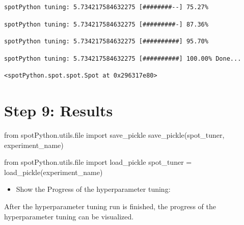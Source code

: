 \documentclass[
  letterpaper,
  DIV=11,
  numbers=noendperiod]{scrreprt}
\newenvironment{Shaded}{\begin{snugshade}}{\end{snugshade}}
\newcommand{\BuiltInTok}[1]{\textcolor[rgb]{0.00,0.23,0.31}{#1}}
\newcommand{\ImportTok}[1]{\textcolor[rgb]{0.00,0.46,0.62}{#1}}
\newcommand{\NormalTok}[1]{\textcolor[rgb]{0.00,0.23,0.31}{#1}}
\newcommand{\OperatorTok}[1]{\textcolor[rgb]{0.37,0.37,0.37}{#1}}
\providecommand{\tightlist}{%
  \setlength{\itemsep}{0pt}\setlength{\parskip}{0pt}}\usepackage{longtable,booktabs,array}
\begin{document}
\begin{verbatim}
spotPython tuning: 5.734217584632275 [########--] 75.27% 
\end{verbatim}

\begin{verbatim}
spotPython tuning: 5.734217584632275 [#########-] 87.36% 
\end{verbatim}

\begin{verbatim}
spotPython tuning: 5.734217584632275 [##########] 95.70% 
\end{verbatim}

\begin{verbatim}
spotPython tuning: 5.734217584632275 [##########] 100.00% Done...
\end{verbatim}

\begin{verbatim}
<spotPython.spot.spot.Spot at 0x296317e80>
\end{verbatim}

\hypertarget{sec-results-tuning-10}{%
\section{Step 9: Results}\label{sec-results-tuning-10}}

\begin{Shaded}
\begin{Highlighting}[]
\ImportTok{from}\NormalTok{ spotPython.utils.}\BuiltInTok{file} \ImportTok{import}\NormalTok{ save\_pickle}
\NormalTok{save\_pickle(spot\_tuner, experiment\_name)}
\end{Highlighting}
\end{Shaded}

\begin{Shaded}
\begin{Highlighting}[]
\ImportTok{from}\NormalTok{ spotPython.utils.}\BuiltInTok{file} \ImportTok{import}\NormalTok{ load\_pickle}
\NormalTok{spot\_tuner }\OperatorTok{=}\NormalTok{ load\_pickle(experiment\_name)}
\end{Highlighting}
\end{Shaded}

\begin{itemize}
\tightlist
\item
  Show the Progress of the hyperparameter tuning:
\end{itemize}

After the hyperparameter tuning run is finished, the progress of the
hyperparameter tuning can be visualized.
\end{document}
